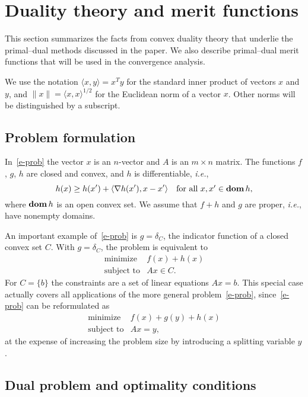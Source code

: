 \documentclass[letterpaper,11pt]{article}
\newcommand{\ie}{{\it i.e.}}
\newcommand{\dom}{\mathop{\bf dom}}
\newcommand{\inprod}[2]{\langle#1, #2\rangle}
\begin{document}
\section{Duality theory and merit functions} \label{s-duality}

This section summarizes the facts from convex duality theory  
that underlie the primal--dual methods discussed in the paper.
We also describe primal--dual merit functions that will be used in
the convergence analysis.

We use the notation $\inprod{x}{y} = x^Ty$ for the
standard inner product of vectors $x$ and $y$, and
$\|x\| = \inprod{x}{x}^{1/2}$ for the Euclidean norm of a vector
$x$.  Other norms will be distinguished by a subscript.

\subsection{Problem formulation}

In~\eqref{e-prob} the vector $x$ is an $n$-vector and
$A$ is an $m\times n$ matrix.  The functions $f$, $g$, $h$
are closed and convex, and $h$ is differentiable, \ie,  
\[
h(x) \geq h(x') + \inprod{\nabla h(x')}{x-x'} \quad
\mbox{for all $x,x' \in \dom h$},
\]
where $\dom h$ is an open convex set.  We assume that $f+h$ and $g$
are proper, \ie, have nonempty domains.

An important example of~\eqref{e-prob} is $g = \delta_C$,
the indicator function of a closed convex set $C$.
With $g=\delta_C$, the problem is equivalent to 
\[
 \begin{array}{ll}
 \mbox{minimize} & f(x) + h(x) \\
 \mbox{subject to} & Ax \in C.
 \end{array}
\]
For $C =\{b\}$ the constraints are a set of linear equations $Ax=b$. 
This special case actually covers all applications of the more general
problem~\eqref{e-prob}, since~\eqref{e-prob} can be reformulated as
\[
 \begin{array}{ll}
 \mbox{minimize} & f(x) + g(y) + h(x) \\
 \mbox{subject to} & Ax=y,
 \end{array}
\]
at the expense of increasing the problem size
by introducing a splitting variable $y$.

\subsection{Dual problem and optimality conditions}
\end{document}
